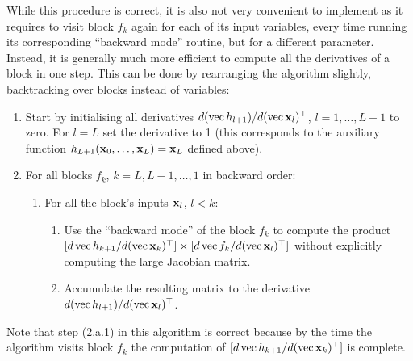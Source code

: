 While this procedure is correct, it is also not very convenient to implement as it requires to visit block $f_k$ again for each of its input variables, every time running its corresponding ``backward mode'' routine, but for a different parameter. Instead, it is generally much more efficient to compute all the derivatives of a block in one step. This can be done by rearranging the algorithm slightly, backtracking over blocks instead of variables:
\begin{enumerate}
\item Start by initialising all derivatives ${d (\operatorname{vec} h_{l+1})}/{d(\operatorname{vec} \mathbf{x}_l)^\top}$, $l=1,\dots,L-1$ to zero. For $l=L$ set the derivative to 1 (this corresponds to the auxiliary function $h_{L+1}(\mathbf{x}_0,\dots,\mathbf{x}_L) = \mathbf{x}_L$ defined above).
\item For all blocks $f_k$, $k=L,L-1,\dots,1$ in backward order:
\begin{enumerate}
	\item For all the block's inputs $\mathbf{x}_l$, $l < k$:
	\begin{enumerate}
	\item Use the ``backward mode'' of the block $f_k$ to compute the product $[{d\operatorname{vec} h_{k+1}}/{d(\operatorname{vec} \mathbf{x}_k)^\top}]\times[
{d\operatorname{vec} f_k}/{d(\operatorname{vec} \mathbf{x}_l)^\top}]$  without explicitly computing the large Jacobian matrix. 
	\item Accumulate the resulting matrix to the derivative $d(\operatorname{vec} h_{l+1} )/d(\operatorname{vec} \mathbf{x}_{l})^\top$.
	\end{enumerate}
	\end{enumerate}
\end{enumerate}
Note that step (2.a.1) in this algorithm is correct because by the time the algorithm visits block $f_k$ the computation of $[{d\operatorname{vec} h_{k+1}}/{d(\operatorname{vec} \mathbf{x}_k)^\top}]$ is complete. 
